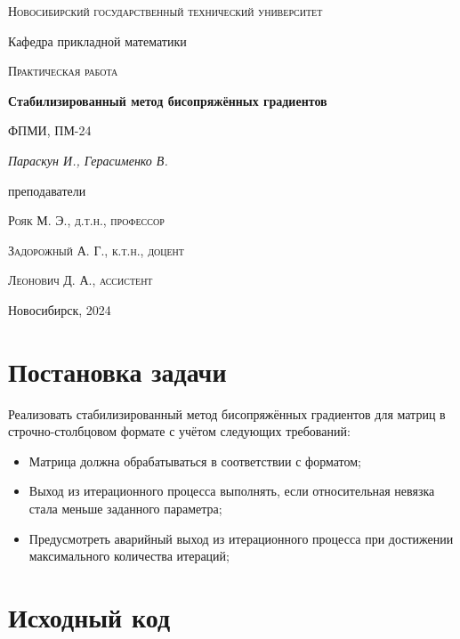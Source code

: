 \documentclass[12pt, a4paper]{article}
\begin{document}
\begin{titlepage}
  \centering
  \textsc{Новосибирский государственный технический университет}\par
  \vspace{1mm}
  Кафедра прикладной математики\par
  \vspace{4cm}
  \textsc{Практическая работа }\par
  {\huge\bfseries Стабилизированный метод бисопряжённых градиентов\par}
  \vspace{1cm}
  {\scriptsize ФПМИ, ПМ-24\par}
  \vspace{1mm}
  {\itshape\large Параскун И., Герасименко В.\par}
  \vfill
  {\small преподаватели\par}
  \vspace{2mm}
  \textsc{Рояк М. Э., д.т.н., профессор}\par
  \vspace{1mm}
  \textsc{Задорожный А. Г., к.т.н., доцент}\par
  \vspace{1mm}
  \textsc{Леонович Д. А., ассистент}\par
  \vfill
  \large{Новосибирск, 2024}
\end{titlepage}

\newpage

\setcounter{page}{2}
\tableofcontents

\newpage

\section{Постановка задачи}
Реализовать стабилизированный метод бисопряжённых градиентов для матриц в строчно-столбцовом 
формате с учётом следующих требований:

\begin{itemize}
  \item Матрица должна обрабатываться в соответствии с форматом;
  \item Выход из итерационного процесса выполнять, если относительная 
    невязка стала меньше заданного параметра;
  \item Предусмотреть аварийный выход из итерационного процесса при достижении 
    максимального количества итераций;
\end{itemize}

\section{Исходный код}
\end{document}
